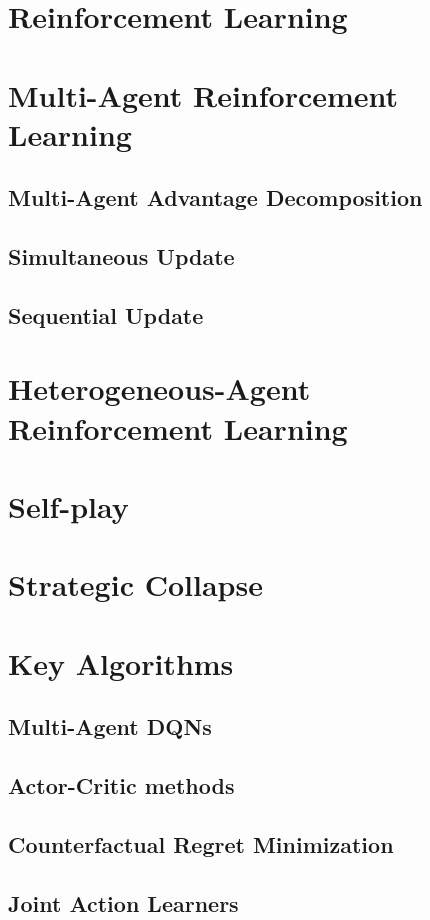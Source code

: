 \section{Reinforcement Learning}


\section{Multi-Agent Reinforcement Learning}
\subsection*{Multi-Agent Advantage Decomposition}
\subsection*{Simultaneous Update}
\subsection*{Sequential Update}


\section{Heterogeneous-Agent Reinforcement Learning}


\section{Self-play}


\section{Strategic Collapse}


\section{Key Algorithms}
\subsection*{Multi-Agent DQNs}
\subsection*{Actor-Critic methods} %
\subsection*{Counterfactual Regret Minimization }
\subsection*{Joint Action Learners}
